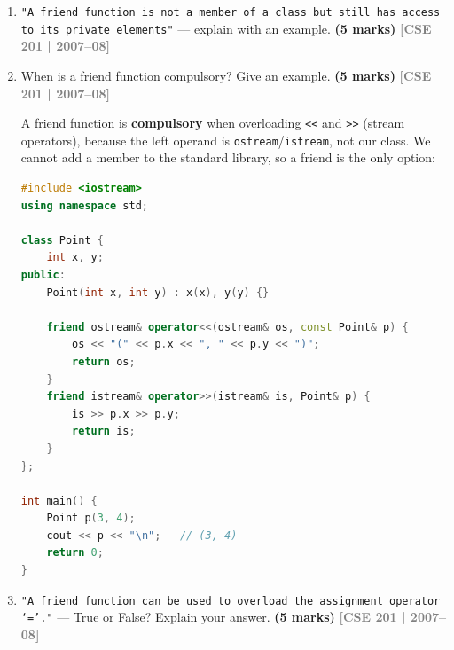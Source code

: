 \documentclass[12pt,a3paper]{article}
\newcommand{\yr}[1]{\hfill\textcolor{gray}{\small\textbf{[#1]}}}
\newcommand{\mk}[1]{\textcolor{orange!70!black}{\small\textbf{(#1 marks)}}}
\begin{document}
\begin{enumerate}
\begin{tcolorbox}[enhanced,breakable,ansbox,colback=cD!4,colframe=cD,
  boxrule=0.8pt,arc=5pt,
  title={\textbf{Answer --- Three statements about friend functions}},
  fonttitle=\bfseries\color{white},colbacktitle=cD]
\begin{enumerate}[label=\textbf{(\alph*)}]
\item \textbf{Member of another class as friend:}
\begin{lstlisting}[language=C++]
class Alpha;
class Beta {
public:
    void inspect(Alpha& a);
};
class Alpha {
    int x = 7;
    friend void Beta::inspect(Alpha&);
};
void Beta::inspect(Alpha& a) {
    cout << "Alpha.x = " << a.x << "\n";
}
\end{lstlisting}

\end{enumerate}
\end{tcolorbox}


\item \texttt{"A friend function is not a member of a class but still has access to its private elements"} --- explain with an example. \mk{5}
\yr{CSE 201 | 2007--08}

\item When is a friend function compulsory? Give an example. \mk{5}
\yr{CSE 201 | 2007--08}


\begin{tcolorbox}[enhanced,breakable,ansbox,colback=cD!4,colframe=cD,
  boxrule=0.8pt,arc=5pt,
  title={\textbf{Answer --- When is a friend function compulsory?}},
  fonttitle=\bfseries\color{white},colbacktitle=cD]

A friend function is \textbf{compulsory} when overloading
\texttt{<<} and \texttt{>>} (stream operators), because the left
operand is \texttt{ostream}/\texttt{istream}, not our class.  We
cannot add a member to the standard library, so a friend is the
only option:

\begin{lstlisting}[language=C++]
#include <iostream>
using namespace std;

class Point {
    int x, y;
public:
    Point(int x, int y) : x(x), y(y) {}

    friend ostream& operator<<(ostream& os, const Point& p) {
        os << "(" << p.x << ", " << p.y << ")";
        return os;
    }
    friend istream& operator>>(istream& is, Point& p) {
        is >> p.x >> p.y;
        return is;
    }
};

int main() {
    Point p(3, 4);
    cout << p << "\n";   // (3, 4)
    return 0;
}
\end{lstlisting}

\end{tcolorbox}


\item \texttt{"A friend function can be used to overload the assignment operator `='."} --- True or False? Explain your answer. \mk{5}
\yr{CSE 201 | 2007--08}



\end{enumerate}
\end{document}
